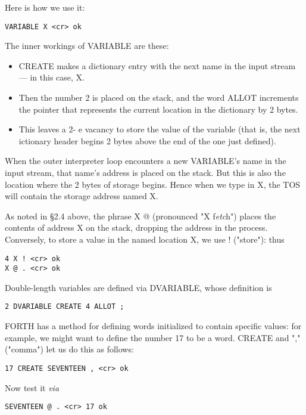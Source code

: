 Here is how we use it:
\begin{lstlisting}
VARIABLE X <cr> ok
\end{lstlisting}

The inner workings of VARIABLE are these:
\begin{itemize}
    \item CREATE makes a dictionary entry with the next name in the input stream — in this case, X.
    \item Then the number 2 is placed on the stack, and the word ALLOT increments the pointer that represents the current location in the dictionary by 2 bytes.
    \item This leaves a 2- e vacancy to store the value of the variable (that is, the next ictionary header begins 2 bytes above the end of the one just defined).
\end{itemize}

When the outer interpreter loop encounters a new VARIABLE's name in the input stream, that name’s address is placed on the stack. But this is also the location where the 2 bytes of storage begins. Hence when we type in X, the TOS will contain the storage address named X.

As noted in §2.4 above, the phrase X @ (pronounced "X f\textit{etc}h") places the contents of address X on the stack, dropping the address in the process. Conversely, to store a value in the named location X, we use ! ("store"): thus
\begin{lstlisting}
4 X ! <cr> ok
X @ . <cr> ok
\end{lstlisting}

Double-length variables are defined via DVARIABLE, whose definition is

\begin{lstlisting}
2 DVARIABLE CREATE 4 ALLOT ;
\end{lstlisting}

FORTH has a method for defining words initialized to contain specific values: for example, we might want to define the number 17 to be a word. CREATE and "," ("comma") let us do this as follows:

\begin{lstlisting}
17 CREATE SEVENTEEN , <cr> ok
\end{lstlisting}

Now test it \textit{via}

\begin{lstlisting}
SEVENTEEN @ . <cr> 17 ok
\end{lstlisting}

